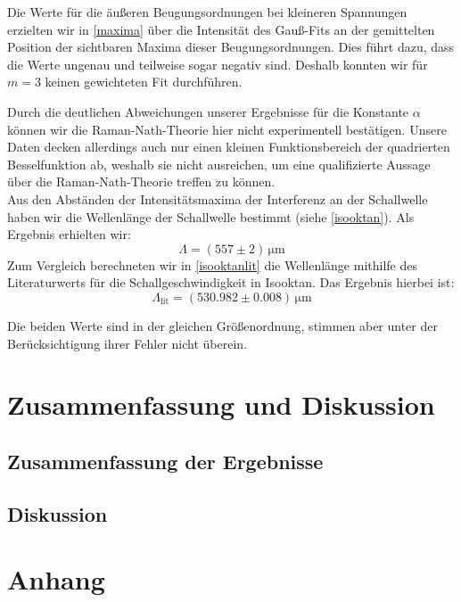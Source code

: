 \documentclass[12pt]{article}
\begin{document}
Die Werte für die äußeren Beugungsordnungen bei kleineren Spannungen erzielten wir in \ref{maxima} über die Intensität des Gauß-Fits an der gemittelten Position der sichtbaren Maxima dieser Beugungsordnungen. Dies führt dazu, dass die Werte ungenau und teilweise sogar negativ sind. Deshalb konnten wir für $m=3$ keinen gewichteten Fit durchführen.

Durch die deutlichen Abweichungen unserer Ergebnisse für die Konstante $\alpha$ können wir die Raman-Nath-Theorie hier nicht experimentell bestätigen. Unsere Daten decken allerdings auch nur einen kleinen Funktionsbereich der quadrierten Besselfunktion ab, weshalb sie nicht ausreichen, um eine qualifizierte Aussage über die Raman-Nath-Theorie treffen zu können.\\

Aus den Abständen der Intensitätsmaxima der Interferenz an der Schallwelle haben wir die Wellenlänge der Schallwelle bestimmt (siehe \ref{isooktan}). Als Ergebnis erhielten wir: $$\Lambda=(557\pm2)\,\mathrm{\mu m}$$ Zum Vergleich berechneten wir in \ref{isooktanlit} die Wellenlänge mithilfe des Literaturwerts für die Schallgeschwindigkeit in Isooktan. Das Ergebnis hierbei ist: $$\Lambda_{\mathrm{lit}}=(530.982\pm0.008)\,\mathrm{\mu m}$$

Die beiden Werte sind in der gleichen Größenordnung, stimmen aber unter der Berücksichtigung ihrer Fehler nicht überein.

\newpage
\section{Zusammenfassung und Diskussion}

\subsection{Zusammenfassung der Ergebnisse}



\subsection{Diskussion}


\newpage
\section{Anhang} 
\end{document}

